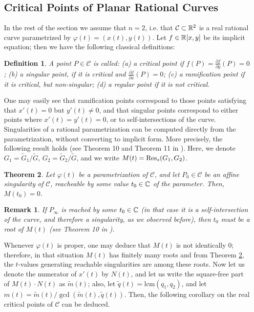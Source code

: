 \documentclass{elsart}
\def\Res{{\rm Res}}
\newtheorem{theorem}{{\bf Theorem}}
\newtheorem{remark}{{\bf Remark}}
\newtheorem{definition}[theorem]{{\bf Definition}}
\begin{document}
\subsection{Critical Points of Planar Rational Curves}\label{add-back}

In the rest of the section we assume that $n=2$, i.e.
that ${\mathcal C}\subset {\Bbb R}^2$ is a real rational curve
 parametrized by $\varphi(t)=(x(t),y(t))$. Let $f\in {\Bbb R}[x,y]$
be its implicit equation; then we have the following classical definitions:


\begin{definition} \label{def-crit-points}
A point $P\in {\mathcal C}$ is  called: (a) {\sf a critical point}
if $f(P)=\frac{\partial f}{\partial y}(P)=0$; (b) {\sf a singular
point}, if it is critical and $\frac{\partial f}{\partial
x}(P)=0$; (c) {\sf a ramification point} if it is critical, but
non-singular; (d) {\sf a  regular point} if it is not critical.
\end{definition}

One may easily see that ramification points
correspond to those points satisfying that $x'(t)=0$ but $y'(t)\neq 0$, and that
singular points correspond to either points where $x'(t)=y'(t)=0$, or to
self-intersections of the curve. Singularities of a rational parametrization
can be computed directly from the parametrization, without converting to
implicit form. More precisely, the following result holds (see Theorem 10 and Theorem 11 in \cite{Sonia}).
Here, we denote $G_1=\tilde{G}_1/\tilde{G}$, $G_2=\tilde{G}_2/\tilde{G}$, and we write
$M(t)=\Res_s(G_1,G_2)$.

\begin{theorem} \label{th-sing-param}
Let $\varphi(t)$ be a parametrization of ${\mathcal C}$, and let $P_0\in {\mathcal C}$ be an affine singularity
of ${\mathcal C}$, reacheable by some value $t_0\in {\Bbb C}$ of the parameter. Then, $M(t_0)=0$.
\end{theorem}

\begin{remark} \label{inf-sing}
If $P_{\infty}$ is reached by some $t_0\in {\Bbb C}$ (in that case it is a
self-intersection of
the curve, and therefore a
singularity,
as we observed before), then $t_0$ must be a root of $M(t)$
(see Theorem 10 in
\cite{Sonia}).
\end{remark}


Whenever $\varphi(t)$ is proper, one may
deduce that $M(t)$ is not identically $0$; therefore, in that situation $M(t)$ has finitely many roots and from Theorem \ref{th-sing-param}, the $t$-values generating reachable singularities are among these roots. Now let us denote the numerator of $x'(t)$ by $N(t)$, and let us write the square-free part of $M(t)\cdot N(t)$ as $\tilde{m}(t)$; also, let $\tilde{q}(t)=\mbox{lcm}(q_1,q_2)$, and let $m(t)=\tilde{m}(t)/\gcd(\tilde{m}(t),\tilde{q}(t))$. Then, the following corollary on the real critical points of ${\mathcal C}$
can be deduced.
\end{document}
